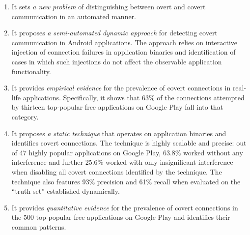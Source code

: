 \vspace{-0.05in}
\begin{enumerate}[leftmargin=0.5cm]\setlength{\itemsep}{-0.01in}

\item It sets \emph{a new problem} of distinguishing between overt and covert communication in an automated manner.


\item It proposes \emph{a semi-automated dynamic approach} for detecting covert communication in Android applications. 
The approach relies on interactive injection of connection failures
in application binaries and identification of cases in which such injections do not
affect the observable application functionality.

\item It provides \emph{empirical evidence} for the prevalence of covert connections in real-life applications. Specifically, it shows that 63\% of the connections attempted by thirteen top-popular free applications on Google Play fall into that category.    

\item It proposes \emph{a static technique} that operates on
application binaries and identifies covert connections. 
The
technique is highly scalable and precise: out of 47 highly popular
applications on Google Play, 63.8\% worked without any interference
and further 25.6\% worked with only insignificant interference when
disabling all covert connections identified by the technique.
The technique also features 93\% precision and 61\% recall when evaluated on the ``truth set'' established dynamically.  

\item It provides \emph{quantitative evidence} for the prevalence of covert connections in the 500 top-popular free applications on Google Play and identifies their common patterns. 


\end{enumerate}

